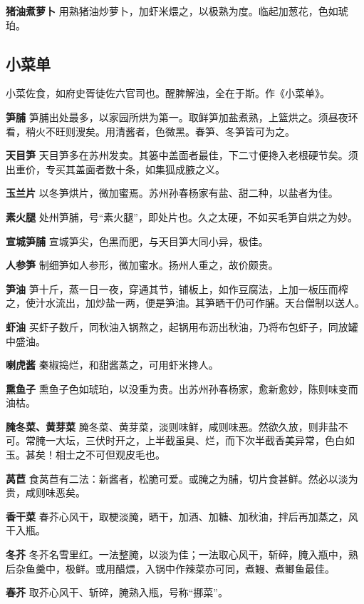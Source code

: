\documentclass[]{article}
\begin{document}
\textbf{猪油煮萝卜}
用熟猪油炒萝卜，加虾米煨之，以极熟为度。临起加葱花，色如琥珀。

\hypertarget{header-n29}{%
\subsection{小菜单}\label{header-n29}}

小菜佐食，如府史胥徒佐六官司也。醒脾解浊，全在于斯。作《小菜单》。

\textbf{笋脯}
笋脯出处最多，以家园所烘为第一。取鲜笋加盐煮熟，上篮烘之。须昼夜环看，稍火不旺则溲矣。用清酱者，色微黑。春笋、冬笋皆可为之。

\textbf{天目笋}
天目笋多在苏州发卖。其篓中盖面者最佳，下二寸便搀入老根硬节矣。须出重价，专买其盖面者数十条，如集狐成腋之义。

\textbf{玉兰片}
以冬笋烘片，微加蜜焉。苏州孙春杨家有盐、甜二种，以盐者为佳。

\textbf{素火腿}
处州笋脯，号``素火腿''，即处片也。久之太硬，不如买毛笋自烘之为妙。

\textbf{宣城笋脯} 宣城笋尖，色黑而肥，与天目笋大同小异，极佳。

\textbf{人参笋} 制细笋如人参形，微加蜜水。扬州人重之，故价颇贵。

\textbf{笋油}
笋十斤，蒸一日一夜，穿通其节，铺板上，如作豆腐法，上加一板压而榨之，使汁水流出，加炒盐一两，便是笋油。其笋晒干仍可作脯。天台僧制以送人。

\textbf{虾油}
买虾子数斤，同秋油入锅熬之，起锅用布沥出秋油，乃将布包虾子，同放罐中盛油。

\textbf{喇虎酱} 秦椒捣烂，和甜酱蒸之，可用虾米搀人。

\textbf{熏鱼子}
熏鱼子色如琥珀，以没重为贵。出苏州孙春杨家，愈新愈妙，陈则味变而油枯。

\textbf{腌冬菜、黄芽菜}
腌冬菜、黄芽菜，淡则味鲜，咸则味恶。然欲久放，则非盐不可。常腌一大坛，三伏时开之，上半截虽臭、烂，而下次半截香美异常，色白如玉。甚矣！相士之不可但观皮毛也。

\textbf{莴苣}
食莴苣有二法：新酱者，松脆可爱。或腌之为脯，切片食甚鲜。然必以淡为贵，咸则味恶矣。

\textbf{香干菜}
春芥心风干，取梗淡腌，晒干，加酒、加糖、加秋油，拌后再加蒸之，风干入瓶。

\textbf{冬芥}
冬芥名雪里红。一法整腌，以淡为佳；一法取心风干，斩碎，腌入瓶中，熟后杂鱼羹中，极鲜。或用醋煨，入锅中作辣菜亦可同，煮鳗、煮鲫鱼最佳。

\textbf{春芥} 取芥心风干、斩碎，腌熟入瓶，号称``挪菜''。
\end{document}
